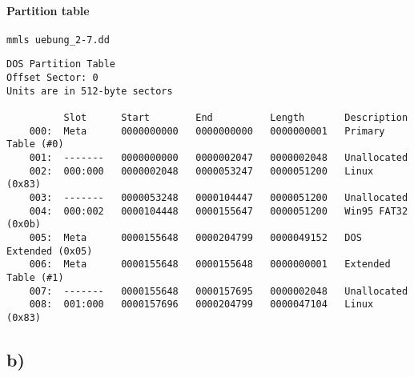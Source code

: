 \documentclass[10pt,a4paper]{article}
\begin{document}
\paragraph{Partition table}
\Verb+mmls uebung_2-7.dd+
\begin{lstlisting}
DOS Partition Table
Offset Sector: 0
Units are in 512-byte sectors
    
          Slot      Start        End          Length       Description
    000:  Meta      0000000000   0000000000   0000000001   Primary Table (#0)
    001:  -------   0000000000   0000002047   0000002048   Unallocated
    002:  000:000   0000002048   0000053247   0000051200   Linux (0x83)
    003:  -------   0000053248   0000104447   0000051200   Unallocated
    004:  000:002   0000104448   0000155647   0000051200   Win95 FAT32 (0x0b)
    005:  Meta      0000155648   0000204799   0000049152   DOS Extended (0x05)
    006:  Meta      0000155648   0000155648   0000000001   Extended Table (#1)
    007:  -------   0000155648   0000157695   0000002048   Unallocated
    008:  001:000   0000157696   0000204799   0000047104   Linux (0x83)
\end{lstlisting}
\subsection{b)}
\end{document}
